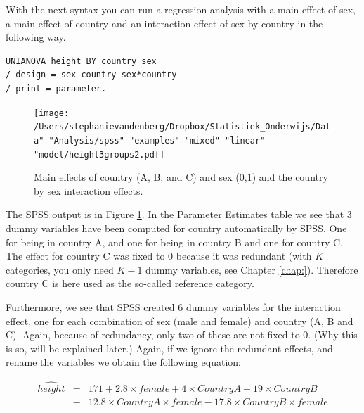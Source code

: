 \documentclass[]{report}\usepackage[]{graphicx}\usepackage[]{color}
\begin{document}
With the next syntax you can run a regression analysis with a main effect of sex, a main effect of country and an interaction effect of sex by country in the following way.

\begin{verbatim}
UNIANOVA height BY country sex 
/ design = sex country sex*country
/ print = parameter.
\end{verbatim}


\begin{figure}[h]
    \begin{center}
       \texttt{[image: /Users/stephanievandenberg/Dropbox/Statistiek\_Onderwijs/Data" "Analysis/spss" "examples" "mixed" "linear" "model/height3groups2.pdf]}
    \end{center}
    \label{fig:interactionheight3group}
    \caption{Main effects of country (A, B, and C) and sex (0,1) and the country by sex interaction effects.}
\end{figure}

The SPSS output is in Figure \ref{fig:interactionheight3group}. In the Parameter Estimates table we see that 3 dummy variables have been computed for country automatically by SPSS. One for being in country A, and one for being in country B and one for country C. The effect for country C was fixed to 0 because it was redundant (with $K$ categories, you only need $K-1$ dummy variables, see Chapter \ref{chap:}). Therefore country C is here used as the so-called reference category. 

Furthermore, we see that SPSS created 6 dummy variables for the interaction effect, one for each combination of sex (male and female) and country (A, B and C). Again, because of redundancy, only two of these are not fixed to 0. (Why this is so, will be explained later.) Again, if we ignore the redundant effects, and rename the variables we obtain the following equation:


\begin{eqnarray} 
\widehat{height} &=& 171 + 2.8  \times female + 4 \times CountryA +  19 \times CountryB \nonumber\\ 
&-& 12.8 \times CountryA \times female - 17.8 \times CountryB \times female  \nonumber
\end{eqnarray}
\end{document}
